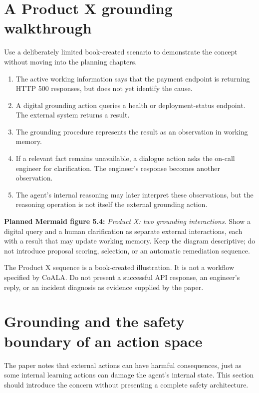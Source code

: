 \section{A Product X grounding walkthrough}
Use a deliberately limited book-created scenario to demonstrate the concept without moving into the planning chapters.
\begin{enumerate}
  \item The active working information says that the payment endpoint is returning HTTP 500 responses, but does not yet identify the cause.
  \item A digital grounding action queries a health or deployment-status endpoint. The external system returns a result.
  \item The grounding procedure represents the result as an observation in working memory.
  \item If a relevant fact remains unavailable, a dialogue action asks the on-call engineer for clarification. The engineer's response becomes another observation.
  \item The agent's internal reasoning may later interpret these observations, but the reasoning operation is not itself the external grounding action.
\end{enumerate}

\textbf{Planned Mermaid figure 5.4:} \emph{Product X: two grounding interactions}. Show a digital query and a human clarification as separate external interactions, each with a result that may update working memory. Keep the diagram descriptive; do not introduce proposal scoring, selection, or an automatic remediation sequence.

\begin{warningbox}
The Product X sequence is a book-created illustration. It is not a workflow specified by CoALA. Do not present a successful API response, an engineer's reply, or an incident diagnosis as evidence supplied by the paper.
\end{warningbox}

\section{Grounding and the safety boundary of an action space}
The paper notes that external actions can have harmful consequences, just as some internal learning actions can damage the agent's internal state. This section should introduce the concern without presenting a complete safety architecture.

